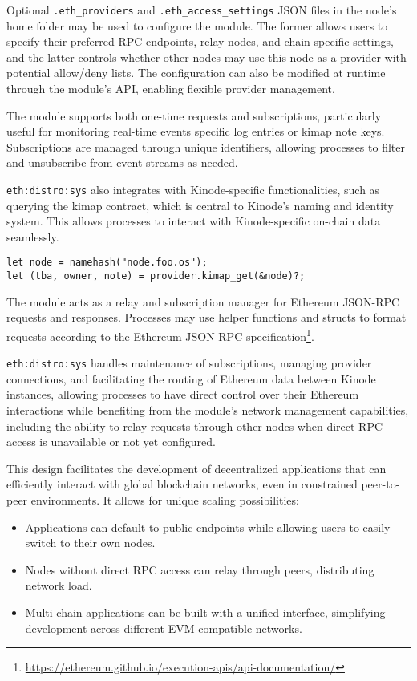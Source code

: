 \documentclass[runningheads]{llncs}
\begin{document}
Optional \verb|.eth_providers| and \verb|.eth_access_settings| JSON files in the node's home folder may be used to configure the module. The former allows users to specify their preferred RPC endpoints, relay nodes, and chain-specific settings, and the latter controls whether other nodes may use this node as a provider with potential allow/deny lists. The configuration can also be modified at runtime through the module's API, enabling flexible provider management.

The module supports both one-time requests and subscriptions, particularly useful for monitoring real-time events specific log entries or kimap note keys. Subscriptions are managed through unique identifiers, allowing processes to filter and unsubscribe from event streams as needed.

\verb|eth:distro:sys| also integrates with Kinode-specific functionalities, such as querying the kimap contract, which is central to Kinode's naming and identity system. This allows processes to interact with Kinode-specific on-chain data seamlessly.

\begin{verbatim}
let node = namehash("node.foo.os");
let (tba, owner, note) = provider.kimap_get(&node)?;
\end{verbatim}

The module acts as a relay and subscription manager for Ethereum JSON-RPC requests and responses. Processes may use helper functions and structs to format requests according to the Ethereum JSON-RPC specification\footnote{\url{https://ethereum.github.io/execution-apis/api-documentation/}}.

\verb|eth:distro:sys| handles maintenance of subscriptions, managing provider connections, and facilitating the routing of Ethereum data between Kinode instances, allowing processes to have direct control over their Ethereum interactions while benefiting from the module's network management capabilities, including the ability to relay requests through other nodes when direct RPC access is unavailable or not yet configured.

This design facilitates the development of decentralized applications that can efficiently interact with global blockchain networks, even in constrained peer-to-peer environments. It allows for unique scaling possibilities:

\begin{itemize}
	\item Applications can default to public endpoints while allowing users to easily switch to their own nodes.
	\item Nodes without direct RPC access can relay through peers, distributing network load.
	\item Multi-chain applications can be built with a unified interface, simplifying development across different EVM-compatible networks.
\end{itemize}
\end{document}
